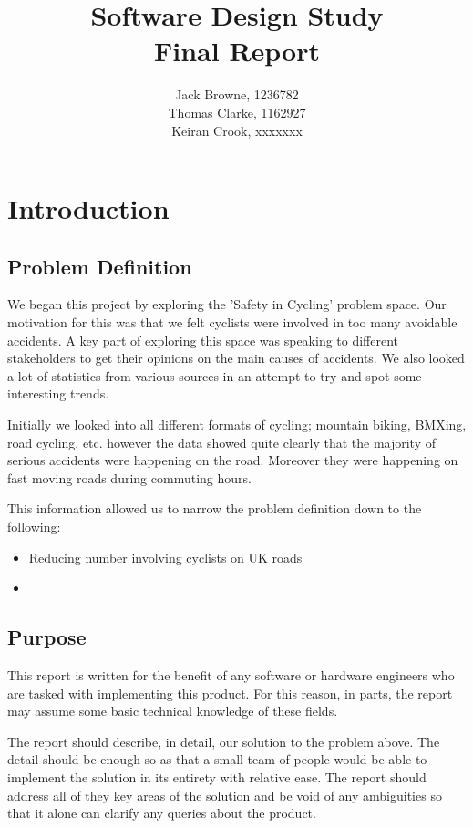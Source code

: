 \documentclass[]{report}
\title{Software Design Study\\Final Report}
\author{Jack Browne, 1236782\\Thomas Clarke, 1162927\\Keiran Crook, xxxxxxx}
\begin{document}
\maketitle

\tableofcontents

\chapter{Introduction}
\section{Problem Definition}
We began this project by exploring the 'Safety in Cycling' problem space. Our motivation for this was that we felt cyclists were involved in too many avoidable accidents. 
A key part of exploring this space was speaking to different stakeholders to get their opinions on the main causes of accidents. We also looked a lot of statistics from various sources in an attempt to try and spot some interesting trends.

Initially we looked into all different formats of cycling; mountain biking, BMXing, road cycling, etc. however the data showed quite clearly that the majority of serious accidents were happening on the road. Moreover they were happening on fast moving roads during commuting hours.

This information allowed us to narrow the problem definition down to the following:
\begin{itemize}
  \item Reducing number involving cyclists on UK roads
  \item 
\end{itemize}
\section{Purpose}
This report is written for the benefit of any software or hardware engineers who are tasked with implementing this product. For this reason, in parts, the report may assume some basic technical knowledge of these fields. 

The report should describe, in detail, our solution to the problem above. The detail should be enough so as that a small team of people would be able to implement the solution in its entirety with relative ease. The report should address all of they key areas of the solution and be void of any ambiguities so that it alone can clarify any queries about the product.
\end{document}
